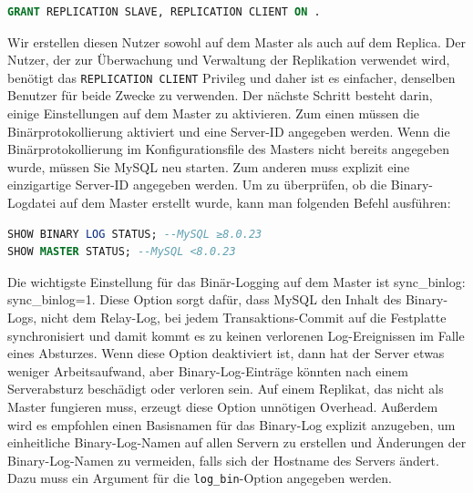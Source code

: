 \vspace{-5pt}
\begin{lstlisting}[language=SQL,caption=Nutzererstellung und Rechtevergabe,label={lst:repl_privileges}]
GRANT REPLICATION SLAVE, REPLICATION CLIENT ON .
\end{lstlisting}
\vspace{-5pt}

Wir erstellen diesen Nutzer sowohl auf dem Master als auch auf dem Replica.
Der Nutzer, der zur Überwachung und Verwaltung der Replikation verwendet wird, benötigt das \texttt{REPLICATION CLIENT} Privileg und daher ist es einfacher, denselben Benutzer für beide Zwecke zu verwenden.
Der nächste Schritt besteht darin, einige Einstellungen auf dem Master zu aktivieren.
Zum einen müssen die Binärprotokollierung aktiviert und eine Server-ID angegeben werden.
Wenn die Binärprotokollierung im Konfigurationsfile des Masters nicht bereits angegeben wurde, müssen Sie MySQL neu starten.
Zum anderen muss explizit eine einzigartige Server-ID angegeben werden.
Um zu überprüfen, ob die Binary-Logdatei auf dem Master erstellt wurde, kann man folgenden Befehl ausführen:

\vspace{-5pt}
\begin{lstlisting}[language=SQL,caption=Anzeige der Konfiguration,label={lst:repl_master_config}]
SHOW BINARY LOG STATUS; --MySQL ≥8.0.23
SHOW MASTER STATUS; --MySQL <8.0.23
\end{lstlisting}
\vspace{-5pt}

Die wichtigste Einstellung für das Binär-Logging auf dem Master ist sync\_binlog: sync\_binlog=1.
Diese Option sorgt dafür, dass MySQL den Inhalt des Binary-Logs, nicht dem Relay-Log, bei jedem Transaktions-Commit auf die Festplatte synchronisiert und damit kommt es zu keinen verlorenen Log-Ereignissen im Falle eines Absturzes.
Wenn diese Option deaktiviert ist, dann hat der Server etwas weniger Arbeitsaufwand, aber Binary-Log-Einträge könnten nach einem Serverabsturz beschädigt oder verloren sein.
Auf einem Replikat, das nicht als Master fungieren muss, erzeugt diese Option unnötigen Overhead.
Außerdem wird es empfohlen einen Basisnamen für das Binary-Log explizit anzugeben, um einheitliche Binary-Log-Namen auf allen Servern zu erstellen und Änderungen der Binary-Log-Namen zu vermeiden, falls sich der Hostname des Servers ändert.
Dazu muss ein Argument für die \texttt{log\_bin}-Option angegeben werden.

